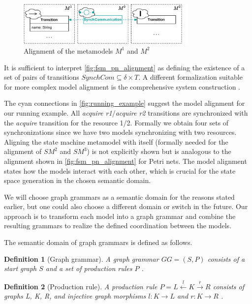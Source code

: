 \documentclass[conference]{IEEEtran}
\newtheorem{definition}{Definition}
\begin{document}
\begin{figure}[h]
    \centering
    \includegraphics[width=3.48in]{fsm_pn_alignment}
    \caption{Alignment of the metamodels $M^1$ and $M^2$}
    \label{fig:fsm_pn_alignment}
\end{figure}

It is sufficient to interpret \autoref{fig:fsm_pn_alignment} as defining the existence of a set of pairs of transitions $SynchCom \subseteq \delta \times T$.
A different formalization suitable for more complex model alignment is the comprehensive system construction \cite{stunkelMultipleModelSynchronization2020}.

The cyan connections in \autoref{fig:running_example} suggest the model alignment for our running example.
All \textit{acquire r1}/\textit{acquire r2} transitions are synchronized with the \textit{acquire} transition for the resource 1/2.
Formally we obtain four sets of synchronizations since we have two models synchronizing with two resources.
Aligning the state machine metamodel with itself (formally needed for the alignment of $SM^2$ and $SM^3$) is not explicitly shown but is analogous to the alignment shown in \autoref{fig:fsm_pn_alignment} for Petri nets.
The model alignment states how the models interact with each other, which is crucial for the state space generation in the chosen semantic domain.

We will choose graph grammars as a semantic domain for the reasons stated earlier, but one could also choose a different domain or switch in the future.
Our approach is to transform each model into a graph grammar and combine the resulting grammars to realize the defined coordination between the models.

The semantic domain of graph grammars is defined as follows.
\begin{definition}[Graph grammar] \label{def:graphGrammar}
A graph grammar $GG=(S, P)$ consists of a start graph $S$ and a set of production rules $P$ \cite{ehrigGraphGrammarsPetri2004}. 
\end{definition}
\begin{definition}[Production rule] \label{def:productionRule}
A production rule $P= L \overset{l}{\leftarrow} K \overset{r}{\to} R$ consists of graphs L, K, R, and injective graph morphisms $l: K \to L$ and $r: K \to R$ \cite{ehrigGraphGrammarsPetri2004}. 
\end{definition}
\end{document}
